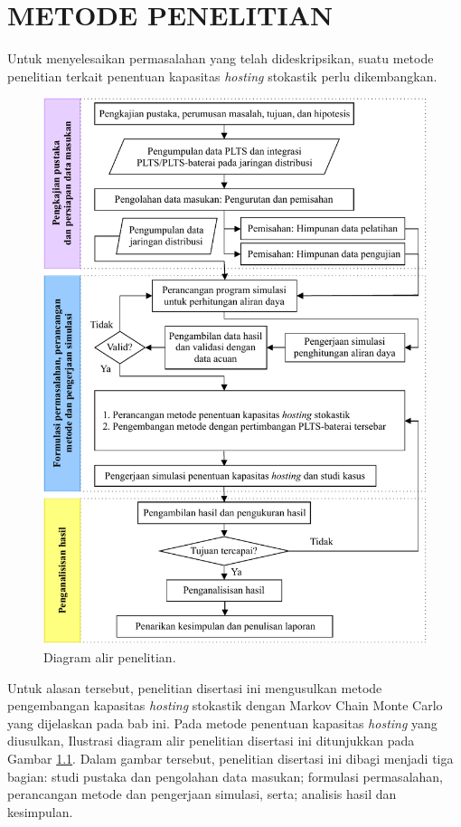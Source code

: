 \chapter{METODE PENELITIAN}
Untuk menyelesaikan permasalahan yang telah dideskripsikan, suatu metode penelitian terkait penentuan kapasitas \textit{\textit{hosting}} stokastik perlu dikembangkan.
\begin{figure}[!b]
	\centering
	\includegraphics[width=1\textwidth]{Fig/fcpenelitian}
	\caption{Diagram alir penelitian.}
	\label{tahapan}
\end{figure}
Untuk alasan tersebut, penelitian disertasi ini mengusulkan metode pengembangan kapasitas \textit{\textit{hosting}} stokastik dengan Markov Chain Monte Carlo yang dijelaskan pada bab ini. Pada metode penentuan kapasitas \textit{\textit{hosting}} yang diusulkan, Ilustrasi diagram alir penelitian disertasi ini ditunjukkan pada Gambar \ref{tahapan}. Dalam gambar tersebut, penelitian disertasi ini dibagi menjadi tiga bagian: studi pustaka dan pengolahan data masukan; formulasi permasalahan, perancangan metode dan pengerjaan simulasi, serta; analisis hasil dan kesimpulan.

